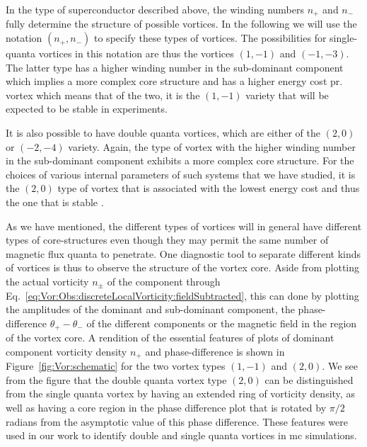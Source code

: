 In the type of superconductor described above, the winding numbers $n_+$ and $n_-$ fully determine the structure of possible vortices. In the following we will use the
notation $(n_+,n_-)$ to specify these types of vortices. The possibilities for single-quanta vortices in this notation are thus the vortices $(1, -1)$ and $(-1,-3)$.
The latter type has a higher winding number in the sub-dominant component which implies a more complex core structure and has a higher energy cost pr. vortex \cite{Garaud15}
which means that of the two, it is the $(1, -1)$ variety that will be expected to be stable in experiments.

It is also possible to have double quanta vortices, which are either of the $(2, 0)$ or $(-2, -4)$ variety. Again, the type of vortex with the higher winding number in
the sub-dominant component exhibits a more complex core structure. For the choices of various internal parameters of such systems that we have studied, it is the $(2, 0)$
type of vortex that is associated with the lowest energy cost and thus the one that is stable \cite{AsleGaraud16,Garaud15,Sauls09}.

As we have mentioned, the different types of vortices will in general have different types of core-structures even though they may permit the same number of magnetic flux
quanta to penetrate. One diagnostic tool to separate different kinds of vortices is thus to observe the structure of the vortex core. Aside from plotting the actual vorticity
$n_\pm$ of the component through Eq.~\eqref{eq:Vor:Obs:discreteLocalVorticity:fieldSubtracted}, this can done by \eg plotting
the amplitudes of the dominant and sub-dominant component, the phase-difference $\theta_+-\theta_-$ of the different components or the magnetic field in the region of
the vortex core. A rendition of the essential features of plots of dominant component vorticity density $n_+$ and phase-difference is shown in Figure~\ref{fig:Vor:schematic} for the
two vortex types $(1,-1)$ and $(2,0)$. We see from the figure that the double quanta vortex type $(2,0)$ can be distinguished from the single quanta vortex by having an
extended ring of vorticity density, as well as having a core region in the phase difference plot that is rotated by $\pi/2$ radians from the asymptotic value of this phase difference.
These features were used in our work to identify double and single quanta vortices in \ac{mc} simulations.

